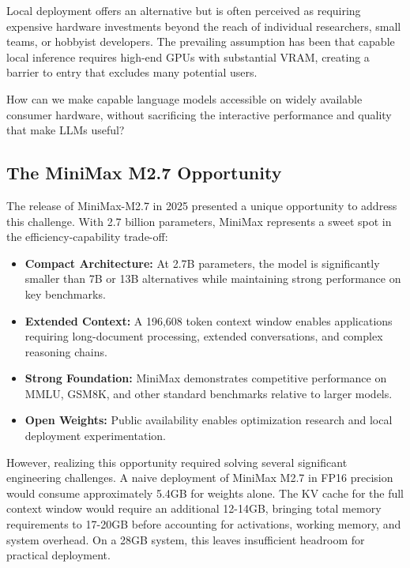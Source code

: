 Local deployment offers an alternative but is often perceived as requiring expensive hardware investments beyond the reach of individual researchers, small teams, or hobbyist developers. The prevailing assumption has been that capable local inference requires high-end GPUs with substantial VRAM, creating a barrier to entry that excludes many potential users.

\begin{tcolorbox}[title=The Local LLM Challenge]
How can we make capable language models accessible on widely available consumer hardware, without sacrificing the interactive performance and quality that make LLMs useful?
\end{tcolorbox}

\subsection{The MiniMax M2.7 Opportunity}

The release of MiniMax-M2.7 in 2025 presented a unique opportunity to address this challenge. With 2.7 billion parameters, MiniMax represents a sweet spot in the efficiency-capability trade-off:

\begin{itemize}
    \item \textbf{Compact Architecture:} At 2.7B parameters, the model is significantly smaller than 7B or 13B alternatives while maintaining strong performance on key benchmarks.
    \item \textbf{Extended Context:} A 196,608 token context window enables applications requiring long-document processing, extended conversations, and complex reasoning chains.
    \item \textbf{Strong Foundation:} MiniMax demonstrates competitive performance on MMLU, GSM8K, and other standard benchmarks relative to larger models.
    \item \textbf{Open Weights:} Public availability enables optimization research and local deployment experimentation.
\end{itemize}

However, realizing this opportunity required solving several significant engineering challenges. A naive deployment of MiniMax M2.7 in FP16 precision would consume approximately 5.4GB for weights alone. The KV cache for the full context window would require an additional 12-14GB, bringing total memory requirements to 17-20GB before accounting for activations, working memory, and system overhead. On a 28GB system, this leaves insufficient headroom for practical deployment.

